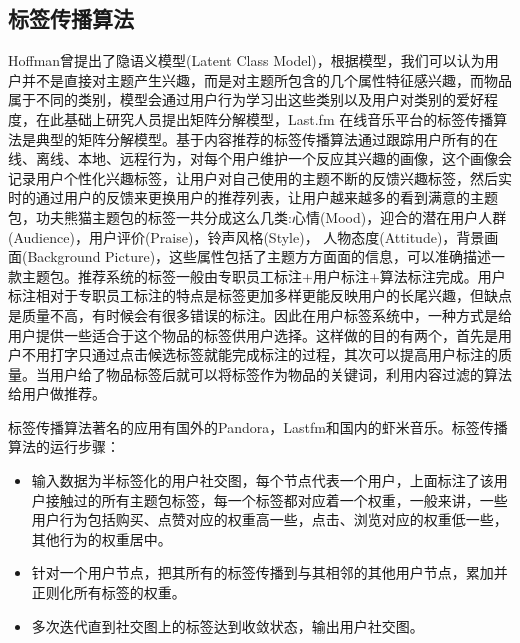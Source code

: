 		\subsection{标签传播算法}
		Hoffman曾提出了隐语义模型(Latent Class Model)\citep{latent-cf}，根据模型，我们可以认为用户并不是直接对主题产生兴趣，而是对主题所包含的几个属性特征感兴趣，而物品属于不同的类别，模型会通过用户行为学习出这些类别以及用户对类别的爱好程度，在此基础上研究人员提出矩阵分解模型，Last.fm 在线音乐平台的标签传播算法是典型的矩阵分解模型。基于内容推荐的标签传播算法通过跟踪用户所有的在线、离线、本地、远程行为，对每个用户维护一个反应其兴趣的画像，这个画像会记录用户个性化兴趣标签，让用户对自己使用的主题不断的反馈兴趣标签，然后实时的通过用户的反馈来更换用户的推荐列表，让用户越来越多的看到满意的主题包，功夫熊猫主题包的标签一共分成这么几类:心情(Mood)，迎合的潜在用户人群(Audience)，用户评价(Praise)，铃声风格(Style)， 人物态度(Attitude)，背景画面(Background Picture)，这些属性包括了主题方方面面的信息，可以准确描述一款主题包。推荐系统的标签一般由专职员工标注+用户标注+算法标注完成。用户标注相对于专职员工标注的特点是标签更加多样更能反映用户的长尾兴趣，但缺点是质量不高，有时候会有很多错误的标注。因此在用户标签系统中，一种方式是给用户提供一些适合于这个物品的标签供用户选择。这样做的目的有两个，首先是用户不用打字只通过点击候选标签就能完成标注的过程，其次可以提高用户标注的质量。当用户给了物品标签后就可以将标签作为物品的关键词，利用内容过滤的算法给用户做推荐。

		标签传播算法著名的应用有国外的Pandora，Lastfm和国内的虾米音乐。标签传播算法的运行步骤：
		\begin{itemize}
		\item 输入数据为半标签化的用户社交图，每个节点代表一个用户，上面标注了该用户接触过的所有主题包标签，每一个标签都对应着一个权重，一般来讲，一些用户行为包括购买、点赞对应的权重高一些，点击、浏览对应的权重低一些，其他行为的权重居中。
		\item 针对一个用户节点，把其所有的标签传播到与其相邻的其他用户节点，累加并正则化所有标签的权重。
		\item 多次迭代直到社交图上的标签达到收敛状态，输出用户社交图。
		\end{itemize}

